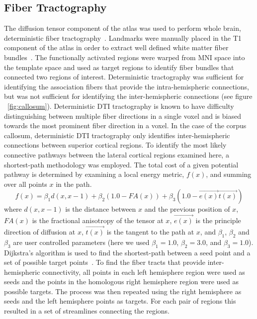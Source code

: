 \subsection{Fiber Tractography}
The diffusion tensor component of the atlas was used to perform whole brain, deterministic fiber tractography~\cite{Cook2006}. Landmarks were manually placed in the T1 component of the atlas in order to extract well defined white matter fiber bundles~\cite{Wakana2004}. The functionally activated regions were warped from MNI space into the template space and used as target regions to identify fiber bundles that connected two regions of interest. Deterministic tractography was sufficient for identifying the association fibers that provide the intra-hemispheric connections, but was not sufficient for identifying the inter-hemispheric connections (see figure ~\ref{fig:callosum}). Deterministic DTI tractography is known to have difficulty distinguishing between multiple fiber directions in a single voxel and is biased towards the most prominent fiber direction in a voxel. In the case of the corpus callosum, deterministic DTI tractography only identifies inter-hemispheric connections between superior cortical regions. To identify the most likely connective pathways between the lateral cortical regions examined here, a shortest-path methodology was employed. The total cost of a given potential pathway is determined by examining a local energy metric, $f(x)$, and summing over all points $x$ in the path. 
\begin{equation}
f(x) = \beta_1 d(x,x-1) + \beta_2 (1.0 - FA(x)) + \beta_3 (1.0 - \vec{e(x)}\vec{t(x)} )
\end{equation}
where $d(x,x-1)$ is the distance between $x$ and the previous position of $x$, $FA(x)$ is the fractional anisotropy of the tensor at $x$, $\vec{e(x)}$ is the principle direction of diffusion at $x$, $\vec{t(x)}$ is the tangent to the path at $x$, and $\beta_1$, $\beta_2$ and $\beta_3$ are user controlled parameters (here we used $\beta_1 = 1.0$, $\beta_2 = 3.0$, and $\beta_3 = 1.0$). Dijkstra's algorithm is used to find the shortest-path between a seed point and a set of possible target points~\cite{Dijkstra1959}. To find the fiber tracts that provide inter-hemispheric connectivity, all points in each left hemisphere region were used as seeds and the points in the homologous right hemisphere region were used as possible targets. The process was then repeated using the right hemisphere as seeds and the left hemisphere points as targets. For each pair of regions this resulted in a set of streamlines connecting the regions.

